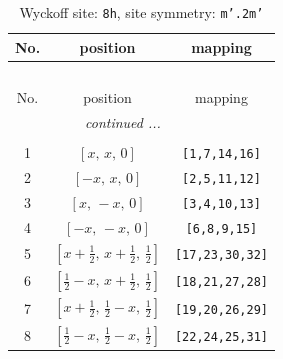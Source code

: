 \documentclass[fleqn,8pt]{jsarticle}
\begin{document}
\begin{longtable}{ccc}
\caption{Wyckoff site: {\tt 8h}, site symmetry: {\tt m'.2m'}}
 \\
 \hline \hline
No. & position & mapping \\ \hline \endfirsthead

\multicolumn{2}{l}{\tablename\ \thetable{}} \\
 \hline \hline
No. & position & mapping \\ \hline \endhead

 \hline \hline
\multicolumn{2}{r}{\footnotesize\it continued ...} \\ \endfoot

 \hline \hline
\multicolumn{2}{r}{} \\ \endlastfoot

1 & $\left[ x,\, x,\, 0 \right]$ & {\tt [1,7,14,16]} \\ \hline
2 & $\left[ - x,\, x,\, 0 \right]$ & {\tt [2,5,11,12]} \\ \hline
3 & $\left[ x,\, - x,\, 0 \right]$ & {\tt [3,4,10,13]} \\ \hline
4 & $\left[ - x,\, - x,\, 0 \right]$ & {\tt [6,8,9,15]} \\ \hline
5 & $\left[ x + \frac{1}{2},\, x + \frac{1}{2},\, \frac{1}{2} \right]$ & {\tt [17,23,30,32]} \\ \hline
6 & $\left[ \frac{1}{2} - x,\, x + \frac{1}{2},\, \frac{1}{2} \right]$ & {\tt [18,21,27,28]} \\ \hline
7 & $\left[ x + \frac{1}{2},\, \frac{1}{2} - x,\, \frac{1}{2} \right]$ & {\tt [19,20,26,29]} \\ \hline
8 & $\left[ \frac{1}{2} - x,\, \frac{1}{2} - x,\, \frac{1}{2} \right]$ & {\tt [22,24,25,31]} \\
\end{longtable}
\renewcommand{\arraystretch}{1.2}
\end{document}

